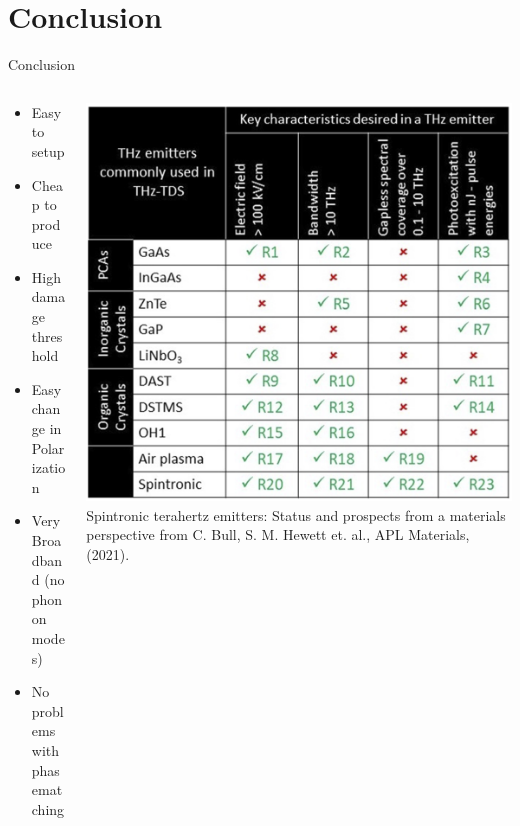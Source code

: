 \documentclass[aspectratio=1610, 9pt]{beamer}
\begin{document}
\section*{Conclusion}
\begin{frame}{Conclusion}
\begin{columns}
\begin{column}{0.5\textwidth}
  \begin{itemize}
    \item Easy to setup
    \vspace{0.2in}
    \item Cheap to produce
    \vspace{0.2in}
    \item High damage threshold
    \vspace{0.2in}    
    \item Easy change in Polarization
    \vspace{0.2in}
    \item Very Broadband (no phonon modes)
    \vspace{0.2in}
    \item No problems with phasematching
  \end{itemize}
\end{column}
\begin{column}{.5\textwidth}
\includegraphics[width=.8\textwidth]{pics/advantage.png}
\small\textcolor{tugreen}{Spintronic terahertz emitters: Status and prospects from a materials perspective} from C. Bull, S. M. Hewett et. al., APL Materials, (2021).
\end{column}
\end{columns}
\end{frame}
\end{document}
